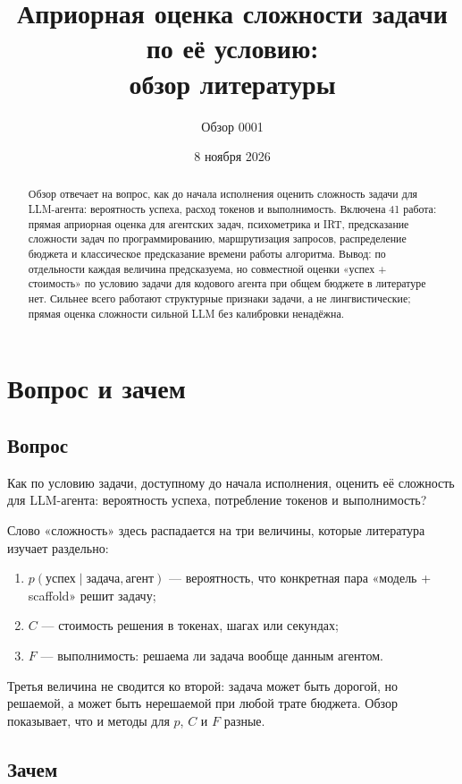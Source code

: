\documentclass[11pt,a4paper]{article}
\title{Априорная оценка сложности задачи по её условию:\\
обзор литературы}
\author{Обзор 0001}
\date{8 ноября 2026}
\begin{document}
\maketitle

\begin{abstract}
\noindent
Обзор отвечает на вопрос, как до начала исполнения оценить сложность задачи
для LLM-агента: вероятность успеха, расход токенов и выполнимость. Включена
41 работа: прямая априорная оценка для агентских задач, психометрика и IRT,
предсказание сложности задач по программированию, маршрутизация запросов,
распределение бюджета и классическое предсказание времени работы алгоритма.
Вывод: по отдельности каждая величина предсказуема, но совместной оценки
«успех + стоимость» по условию задачи для кодового агента при общем бюджете в
литературе нет. Сильнее всего работают структурные признаки задачи, а не
лингвистические; прямая оценка сложности сильной LLM без калибровки
ненадёжна.
\end{abstract}

\section{Вопрос и зачем}

\subsection{Вопрос}

Как по условию задачи, доступному до начала исполнения, оценить её сложность
для LLM-агента: вероятность успеха, потребление токенов и выполнимость?

Слово «сложность» здесь распадается на три величины, которые литература
изучает раздельно:

\begin{enumerate}
  \item $p(\text{успех} \mid \text{задача}, \text{агент})$ — вероятность, что
        конкретная пара «модель + scaffold» решит задачу;
  \item $C$ — стоимость решения в токенах, шагах или секундах;
  \item $F$ — выполнимость: решаема ли задача вообще данным агентом.
\end{enumerate}

Третья величина не сводится ко второй: задача может быть дорогой, но
решаемой, а может быть нерешаемой при любой трате бюджета. Обзор показывает,
что и методы для $p$, $C$ и $F$ разные.

\subsection{Зачем}
\end{document}
